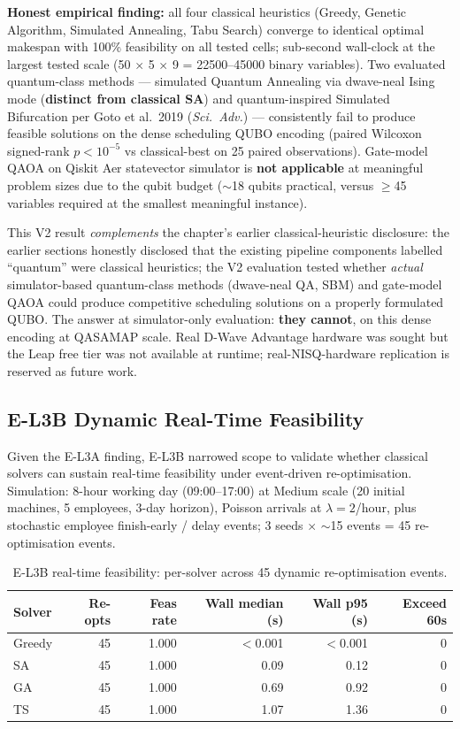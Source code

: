 \textbf{Honest empirical finding:} all four classical heuristics (Greedy, Genetic Algorithm, Simulated Annealing, Tabu Search) converge to identical optimal makespan with 100\% feasibility on all tested cells; sub-second wall-clock at the largest tested scale (50 $\times$ 5 $\times$ 9 = 22500--45000 binary variables). Two evaluated quantum-class methods --- simulated Quantum Annealing via dwave-neal Ising mode (\textbf{distinct from classical SA}) and quantum-inspired Simulated Bifurcation per Goto et al.\ 2019 (\emph{Sci.\ Adv.}) --- consistently fail to produce feasible solutions on the dense scheduling QUBO encoding (paired Wilcoxon signed-rank $p < 10^{-5}$ vs classical-best on 25 paired observations). Gate-model QAOA on Qiskit Aer statevector simulator is \textbf{not applicable} at meaningful problem sizes due to the qubit budget ($\sim$18 qubits practical, versus $\geq$45 variables required at the smallest meaningful instance).

This V2 result \emph{complements} the chapter's earlier classical-heuristic disclosure: the earlier sections honestly disclosed that the existing pipeline components labelled ``quantum'' were classical heuristics; the V2 evaluation tested whether \emph{actual} simulator-based quantum-class methods (dwave-neal QA, SBM) and gate-model QAOA could produce competitive scheduling solutions on a properly formulated QUBO. The answer at simulator-only evaluation: \textbf{they cannot}, on this dense encoding at QASAMAP scale. Real D-Wave Advantage hardware was sought but the Leap free tier was not available at runtime; real-NISQ-hardware replication is reserved as future work.

\subsection{E-L3B Dynamic Real-Time Feasibility}

Given the E-L3A finding, E-L3B narrowed scope to validate whether classical solvers can sustain real-time feasibility under event-driven re-optimisation. Simulation: 8-hour working day (09:00--17:00) at Medium scale (20 initial machines, 5 employees, 3-day horizon), Poisson arrivals at $\lambda = 2$/hour, plus stochastic employee finish-early / delay events; 3 seeds $\times$ $\sim$15 events = 45 re-optimisation events.

\begin{table}[htbp]
\centering
\caption{E-L3B real-time feasibility: per-solver across 45 dynamic re-optimisation events.}
\label{tab:el3b_realtime}
\begin{tabular}{lrrrrr}
\hline
\textbf{Solver} & \textbf{Re-opts} & \textbf{Feas rate} & \textbf{Wall median (s)} & \textbf{Wall p95 (s)} & \textbf{Exceed 60s} \\
\hline
Greedy & 45 & 1.000 & $<$0.001 & $<$0.001 & 0 \\
SA     & 45 & 1.000 & 0.09 & 0.12 & 0 \\
GA     & 45 & 1.000 & 0.69 & 0.92 & 0 \\
TS     & 45 & 1.000 & 1.07 & 1.36 & 0 \\
\hline
\end{tabular}
\end{table}

